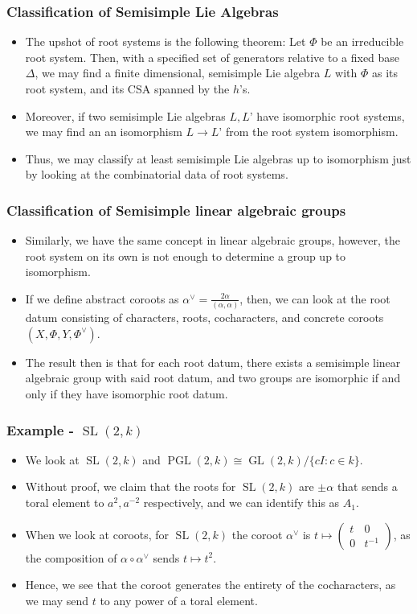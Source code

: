 \documentclass{beamer}
\theoremstyle{remark}
\begin{document}
\begin{frame}
\frametitle{Classification of Semisimple Lie Algebras}
\begin{itemize}
\item The upshot of root systems is the following theorem: Let $\Phi$ be an irreducible root system. Then, with a specified set of generators relative to a fixed base $\Delta$,  we may find a finite dimensional, semisimple Lie algebra $L$ with $\Phi$ as its root system, and its CSA spanned by the $h$’s.
\pause
\item Moreover, if two semisimple Lie algebras $L, L’$ have isomorphic root systems, we may find an an isomorphism $L \to L’$ from the root system isomorphism.
\pause
\item Thus, we may classify at least semisimple Lie algebras up to isomorphism just by looking at the combinatorial data of root systems.
\end{itemize}
\end{frame}

\begin{frame}
\frametitle{Classification of Semisimple linear algebraic groups}
\begin{itemize}
\item Similarly, we have the same concept in linear algebraic groups, however, the root system on its own is not enough to determine a group up to isomorphism.
\pause
\item If we define abstract coroots as $\alpha^\vee = \frac{2 \alpha}{(\alpha, \alpha)}$, then, we can look at the root datum consisting of characters, roots, cocharacters, and concrete coroots $(X, \Phi, Y , \Phi^\vee)$.
\pause
\item The result then is that for each root datum, there exists a semisimple linear algebraic group with said root datum, and two groups are isomorphic if and only if they have isomorphic root datum.
\end{itemize}
\end{frame}

\begin{frame}
\frametitle{Example - $\operatorname{SL}(2,k)$}
\begin{itemize}
\item We look at $\operatorname{SL}(2,k)$ and $\operatorname{PGL}(2,k) \cong \operatorname{GL}(2,k)/\{ cI : c \in k \}$.
\pause
\item Without proof, we claim that the roots for $\operatorname{SL}(2,k)$ are $\pm \alpha$ that sends a toral element to $a^2, a^{-2}$ respectively, and we can identify this as $A_1$.
\pause
\item When we look at coroots, for $\operatorname{SL}(2,k)$ the coroot $\alpha^\vee$ is $t \mapsto \begin{pmatrix} t & 0 \\ 0 & t^{-1} \end{pmatrix}$, as the composition of $\alpha \circ \alpha^\vee$ sends $t \mapsto t^2$.
\pause
\item Hence, we see that the coroot generates the entirety of the cocharacters, as we may send $t$ to any power of a toral element.
\end{itemize}
\end{frame}
\end{document}
